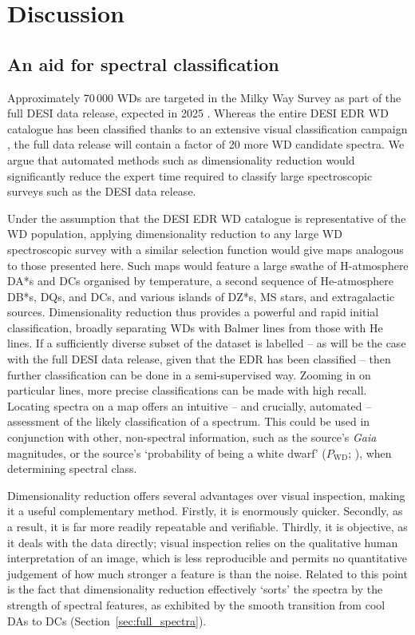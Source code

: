 \documentclass[fleqn,usenatbib]{mnras}
\begin{document}
\section{Discussion}
\label{sec:discussion}

\subsection{An aid for spectral classification}

Approximately $70\,000$ WDs are targeted in the Milky Way Survey as part of the full DESI data release, expected in 2025 \citep{cooper23}.
Whereas the entire DESI EDR WD catalogue has been classified thanks to an extensive visual classification campaign \citep{manser24}, the full data release will contain a factor of 20 more WD candidate spectra.
We argue that automated methods such as dimensionality reduction would significantly reduce the expert time required to classify large spectroscopic surveys such as the DESI data release.

Under the assumption that the DESI EDR WD catalogue is representative of the WD population, applying dimensionality reduction to any large WD spectroscopic survey with a similar selection function would give maps analogous to those presented here.
Such maps would feature a large swathe of H-atmosphere DA*s and DCs organised by temperature, a second sequence of He-atmosphere DB*s, DQs, and DCs, and various islands of DZ*s, MS stars, and extragalactic sources.
Dimensionality reduction thus provides a powerful and rapid initial classification, broadly separating WDs with Balmer lines from those with He lines.
If a sufficiently diverse subset of the dataset is labelled -- as will be the case with the full DESI data release, given that the EDR has been classified -- then further classification can be done in a semi-supervised way.
Zooming in on particular lines, more precise classifications can be made with high recall.
Locating spectra on a map offers an intuitive -- and crucially, automated -- assessment of the likely classification of a spectrum.
This could be used in conjunction with other, non-spectral information, such as the source's \textit{Gaia} magnitudes, or the source's `probability of being a white dwarf' ($P_\text{WD}$; \citealt{gentilefusillo15}), when determining spectral class.

Dimensionality reduction offers several advantages over visual inspection, making it a useful complementary method.
Firstly, it is enormously quicker.
Secondly, as a result, it is far more readily repeatable and verifiable.
Thirdly, it is objective, as it deals with the data directly; visual inspection relies on the qualitative human interpretation of an image, which is less reproducible and permits no quantitative judgement of how much stronger a feature is than the noise.
Related to this point is the fact that dimensionality reduction effectively `sorts' the spectra by the strength of spectral features, as exhibited by the smooth transition from cool DAs to DCs (Section~\ref{sec:full_spectra}).
\end{document}
